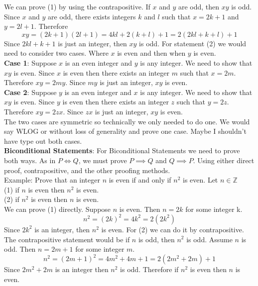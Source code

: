 \documentclass{article}
\begin{document}
We can prove (1) by using the contrapositive. If \(x\) and \(y\) are odd, then \(xy\) is odd. Since \(x\) and \(y\) are odd, there exists integers \(k\) and \(l\) such that \(x = 2k+1\) and \(y = 2l+1\). Therefore
\[xy=(2k+1)(2l+1) = 4kl+2(k+l)+1 = 2(2kl+k+l)+1\]
Since \(2kl+k+1\) is just an integer, then \(xy\) is odd. For statement (2) we would need to consider two cases. Where \(x\) is even and then when \(y\) is even.\\
\textbf{Case 1}: Suppose \(x\) is an even integer and \(y\) is any integer. We need to show that \(xy\) is even. Since \(x\) is even then there exists an integer \(m\) such that \(x = 2m\). Therefore \(xy = 2my\). Since \(my\) is just an integer, \(xy\) is even.\\
\textbf{Case 2}: Suppose \(y\) is an even integer and \(x\) is any integer. We need to show that \(xy\) is even. Since \(y\) is even then there exists an integer \(z\) such that \(y = 2z\). Therefore \(xy = 2zx\). Since \(zx\) is just an integer, \(xy\) is even.\\
The two cases are symmetric so technically we only needed to do one. We would say WLOG or without loss of generality and prove one case. Maybe I shouldn't have type out both cases.\\
\textbf{Biconditional Statements}: For Biconditional Statements we need to prove both ways. As in \(P \iff Q\), we must prove \(P \implies Q\) and \(Q \implies P\). Using either direct proof, contrapositive, and the other proofing methods.\\
Example: Prove that an integer \(n\) is even if and only if \(n^2\) is even. Let \(n \in \mathbb{Z}\)\\
(1) if \(n\) is even then \(n^2\) is even.\\
(2) if \(n^2\) is even then \(n\) is even.\\
We can prove (1) directly. Suppose \(n\) is even. Then \(n = 2k\) for some integer k.
\[n^2 = (2k)^2 = 4k^2 = 2(2k^2)\]
Since \(2k^2\) is an integer, then \(n^2\) is even. For (2) we can do it by contrapositive. The contrapositive statement would be if \(n\) is odd, then \(n^2\) is odd. Assume \(n\) is odd. Then \(n = 2m + 1\) for some integer \(m\). 
\[n^2 = (2m+1)^2 = 4m^2+4m+1 = 2(2m^2+2m)+1\]
Since \(2m^2+2m\) is an integer then \(n^2\) is odd. Therefore if \(n^2\) is even then \(n\) is even.
\end{document}
